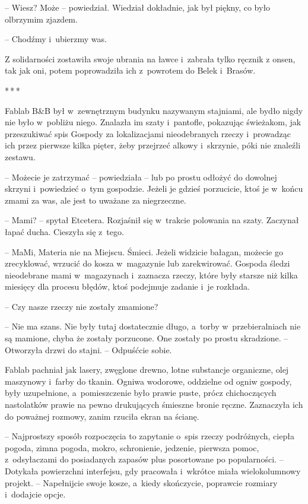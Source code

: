 \documentclass[oneside,polish,11pt,sfheadings]{mwbk}
\newcommand{\threeast}{\bigskip\par\centerline{*\,*\,*}\medskip\par}
\begin{document}
-- Wiesz? Może -- powiedział. Wiedział dokładnie, jak był piękny, co było
olbrzymim zjazdem.

-- Chodźmy i~ubierzmy was.

Z solidarności zostawiła swoje ubrania na ławce i~zabrała tylko ręcznik
z onsen, tak jak oni, potem poprowadziła ich z~powrotem do Belek i~Brasów.

\threeast

Fablab B\&B był w~zewnętrznym budynku nazywanym stajniami, ale bydło
nigdy nie było w~pobliżu niego. Znalazła im szaty i~pantofle, pokazując
świeżakom, jak przeszukiwać spis Gospody za lokalizacjami nieodebranych
rzeczy i~prowadząc ich przez pierwsze kilka pięter, żeby przejrzeć
alkowy i~skrzynie, póki nie znaleźli zestawu. 

-- Możecie je zatrzymać -- powiedziała -- lub po prostu odłożyć do dowolnej skrzyni i~powiedzieć o~tym gospodzie. Jeżeli je gdzieś porzucicie, ktoś je w~końcu zmami za
was, ale jest to uważane za niegrzeczne.

-- Mami? -- spytał Etcetera. Rozjaśnił się w~trakcie polowania na szaty.
Zaczynał łapać ducha. Cieszyła się z~tego.

-- MaMi, Materia nie na Miejscu. Śmieci. Jeżeli widzicie bałagan, możecie
go zrecyklować, wrzucić do kosza w~magazynie lub zarekwirować. Gospoda
śledzi nieodebrane mami w~magazynach i~zaznacza rzeczy, które były
starsze niż kilka miesięcy dla procesu błędów, ktoś podejmuje zadanie i~je rozkłada.

-- Czy nasze rzeczy nie zostały zmamione?

-- Nie ma szans. Nie były tutaj dostatecznie długo, a~torby w~przebieralniach nie są mamione, chyba że zostały porzucone. One zostały
po prostu skradzione. -- Otworzyła drzwi do stajni. -- Odpuśćcie sobie.

Fablab pachniał jak lasery, zwęglone drewno, lotne substancje
organiczne, olej maszynowy i~farby do tkanin. Ogniwa wodorowe, oddzielne
od ogniw gospody, były uzupełnione, a~pomieszczenie było prawie puste,
prócz chichoczących nastolatków prawie na pewno drukujących śmieszne
bronie ręczne. Zaznaczyła ich do poważnej rozmowy, zanim rzuciła ekran
na ścianę.

-- Najprostszy sposób rozpoczęcia to zapytanie o~spis rzeczy podróżnych,
ciepła pogoda, zimna pogoda, mokro, schronienie, jedzenie, pierwsza
pomoc, z~odsyłaczami do posiadanych zapasów plus posortowane po
popularności. -- Dotykała powierzchni interfejsu, gdy pracowała i~wkrótce
miała wielokolumnowy projekt. -- Napełnijcie swoje kosze, a~kiedy
skończycie, poprawcie rozmiary i~dodajcie opcje.
\end{document}
